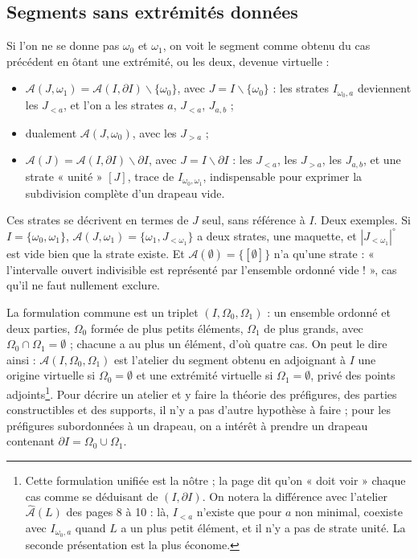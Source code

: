 \documentclass[11pt,a4paper]{article}
\begin{document}
\subsection*{Segments sans extrémités données}

Si l'on ne se donne pas $\omega_{0}$ et $\omega_{1}$, on voit le segment comme
obtenu du cas précédent en ôtant une extrémité, ou les deux, devenue virtuelle :
\begin{itemize}
\item $\mathcal{A}(J, \omega_{1}) = \mathcal{A}(I, \partial I) \smallsetminus
\{\omega_{0}\}$, avec $J = I \smallsetminus \{\omega_{0}\}$ : les strates
$I_{\omega_{0},a}$ deviennent les $J_{<a}$, et l'on a les strates $a$,
$J_{<a}$, $J_{a,b}$ ;
\item dualement $\mathcal{A}(J, \omega_{0})$, avec les $J_{>a}$ ;
\item $\mathcal{A}(J) = \mathcal{A}(I, \partial I) \smallsetminus \partial I$,
avec $J = I \smallsetminus \partial I$ : les $J_{<a}$, les $J_{>a}$, les
$J_{a,b}$, et une strate « unité » $[J]$, trace de $I_{\omega_{0},\omega_{1}}$,
indispensable pour exprimer la subdivision complète d'un drapeau vide.
\end{itemize}
Ces strates se décrivent en termes de $J$ seul, sans référence à $I$. Deux
exemples. Si $I = \{\omega_{0}, \omega_{1}\}$, $\mathcal{A}(J, \omega_{1}) =
\{\omega_{1}, J_{<\omega_{1}}\}$ a deux strates, une maquette, et
$|J_{<\omega_{1}}|^{\circ}$ est vide bien que la strate existe. Et
$\mathcal{A}(\emptyset) = \{[\emptyset]\}$ n'a qu'une strate : « l'intervalle
ouvert indivisible est représenté par l'ensemble ordonné vide ! », cas qu'il
ne faut nullement exclure.

La formulation commune est un triplet $(I, \Omega_{0}, \Omega_{1})$ : un ensemble
ordonné et deux parties, $\Omega_{0}$ formée de plus petits éléments,
$\Omega_{1}$ de plus grands, avec $\Omega_{0} \cap \Omega_{1} = \emptyset$ ;
chacune a au plus un élément, d'où quatre cas. On peut le dire ainsi :
$\mathcal{A}(I, \Omega_{0}, \Omega_{1})$ est l'atelier du segment obtenu en
adjoignant à $I$ une origine virtuelle si $\Omega_{0} = \emptyset$ et une
extrémité virtuelle si $\Omega_{1} = \emptyset$, privé des points
adjoints\footnote{Cette formulation unifiée est la nôtre ; la page dit qu'on
« doit voir » chaque cas comme se déduisant de $(I, \partial I)$. On notera la
différence avec l'atelier $\widehat{\mathcal{A}}(L)$ des pages 8 à 10 : là,
$I_{<a}$ n'existe que pour $a$ non minimal, coexiste avec $I_{\omega_{0},a}$
quand $L$ a un plus petit élément, et il n'y a pas de strate unité. La seconde
présentation est la plus économe.}. Pour décrire un atelier et y faire la théorie
des préfigures, des parties constructibles et des supports, il n'y a pas d'autre
hypothèse à faire ; pour les préfigures subordonnées à un drapeau, on a intérêt
à prendre un drapeau contenant $\partial I = \Omega_{0} \cup \Omega_{1}$.
\end{document}
